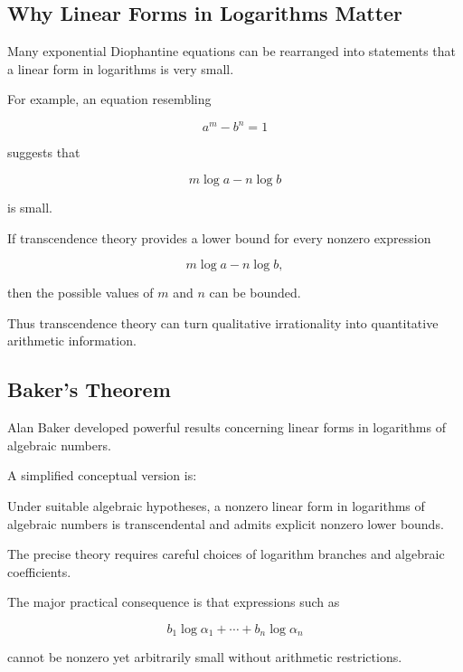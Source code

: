 \subsection{Why Linear Forms in Logarithms Matter}
\label{subsec:why-linear-forms-logarithms}

Many exponential Diophantine equations can be rearranged into statements
that a linear form in logarithms is very small.

For example, an equation resembling

\[ a^m-b^n=1 \]

suggests that

\[ m\log a-n\log b \]

is small.

If transcendence theory provides a lower bound for every nonzero expression

\[ m\log a-n\log b, \]

then the possible values of \(m\) and \(n\) can be bounded.

Thus transcendence theory can turn qualitative irrationality into
quantitative arithmetic information.

\subsection{Baker's Theorem}
\label{subsec:baker-theorem}

Alan Baker developed powerful results concerning linear forms in logarithms
of algebraic numbers.

A simplified conceptual version is:

\begin{theorem}[Baker]
Under suitable algebraic hypotheses, a nonzero linear form in logarithms of
algebraic numbers is transcendental and admits explicit nonzero lower bounds.
\end{theorem}

The precise theory requires careful choices of logarithm branches and
algebraic coefficients.

The major practical consequence is that expressions such as

\[ b_1\log\alpha_1+\cdots+b_n\log\alpha_n \]

cannot be nonzero yet arbitrarily small without arithmetic restrictions.

